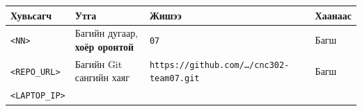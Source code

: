 \begingroup\scriptsize\begin{longtable}[]{@{}llll@{}}
\toprule
\begin{minipage}[b]{0.22\columnwidth}\raggedright
Хувьсагч\strut
\end{minipage} & \begin{minipage}[b]{0.22\columnwidth}\raggedright
Утга\strut
\end{minipage} & \begin{minipage}[b]{0.22\columnwidth}\raggedright
Жишээ\strut
\end{minipage} & \begin{minipage}[b]{0.22\columnwidth}\raggedright
Хаанаас\strut
\end{minipage}\tabularnewline
\midrule
\endhead
\begin{minipage}[t]{0.22\columnwidth}\raggedright
\texttt{\textless{}NN\textgreater{}}\strut
\end{minipage} & \begin{minipage}[t]{0.22\columnwidth}\raggedright
Багийн дугаар, \textbf{хоёр оронтой}\strut
\end{minipage} & \begin{minipage}[t]{0.22\columnwidth}\raggedright
\texttt{07}\strut
\end{minipage} & \begin{minipage}[t]{0.22\columnwidth}\raggedright
Багш\strut
\end{minipage}\tabularnewline
\begin{minipage}[t]{0.22\columnwidth}\raggedright
\texttt{\textless{}REPO\_\allowbreak{}URL\textgreater{}}\strut
\end{minipage} & \begin{minipage}[t]{0.22\columnwidth}\raggedright
Багийн Git сангийн хаяг\strut
\end{minipage} & \begin{minipage}[t]{0.22\columnwidth}\raggedright
\texttt{https:\allowbreak{}/\allowbreak{}/\allowbreak{}github.\allowbreak{}com/\allowbreak{}\ldots{}/\allowbreak{}cnc302-team07.\allowbreak{}git}\strut
\end{minipage} & \begin{minipage}[t]{0.22\columnwidth}\raggedright
Багш\strut
\end{minipage}\tabularnewline
\begin{minipage}[t]{0.22\columnwidth}\raggedright
\texttt{\textless{}LAPTOP\_\allowbreak{}IP\textgreater{}}\strut
\end{minipage} & \begin{minipage}[t]{0.22\columnwidth}\raggedright

\end{minipage}
\end{longtable}
